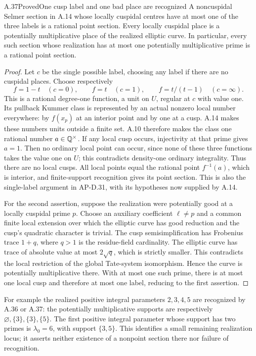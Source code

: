 \begin{statement}{A.37}{Proved}{One cusp label and one bad place are recognized}
A noncuspidal Selmer section in A.14 whose locally cuspidal centres
have at most one of the three labels is a rational point section.
Every locally cuspidal place is a potentially multiplicative place
of the realized elliptic curve.  In particular, every such section
whose realization has at most one potentially multiplicative prime
is a rational point section.
\end{statement}
\begin{proof}
Let $c$ be the single possible label, choosing any label if there are
no cuspidal places.  Choose respectively
\[
       f=1-t\quad(c=0),\qquad f=t\quad(c=1),\qquad
       f=t/(t-1)\quad(c=\infty).
\]
This is a rational degree-one function, a unit on $U$, regular at
$c$ with value one.  Its pullback Kummer class is represented by an
actual nonzero local number everywhere: by $f(x_p)$ at an interior
point and by one at a cusp.  A.14 makes these numbers units outside
a finite set.  A.10 therefore makes the class one rational number
$a\in\mathbb Q^\times$.  If any local cusp occurs, injectivity at that
prime gives $a=1$.  Then no ordinary local point can occur, since
none of these three functions takes the value one on $U$; this
contradicts density-one ordinary integrality.  Thus there are no
local cusps.  All local points equal the rational point $f^{-1}(a)$,
which is interior, and finite-support recognition gives its point
section.  This is also the single-label argument in AP-D.31, with
its hypotheses now supplied by A.14.

For the second assertion, suppose the realization were potentially
good at a locally cuspidal prime $p$.  Choose an auxiliary coefficient
$\ell\ne p$ and a common finite local extension over which the
elliptic curve has good reduction and the cusp's quadratic character
is trivial.  The cusp semisimplification has Frobenius trace $1+q$,
where $q>1$ is the residue-field cardinality.  The elliptic curve has
trace of absolute value at most $2\sqrt q$, which is strictly smaller.
This contradicts the local restriction of the global Tate-system
isomorphism.  Hence the curve is potentially multiplicative there.
With at most one such prime, there is at most one local cusp and
therefore at most one label, reducing to the first assertion.
\end{proof}
For example the realized positive integral parameters $2,3,4,5$ are
recognized by A.36 or A.37: the potentially multiplicative supports
are respectively $\varnothing,\{3\},\{3\},\{5\}$.
The first positive integral parameter whose support has two primes is
$\lambda_0=6$, with support $\{3,5\}$.
This identifies a small remaining realization locus; it asserts
neither existence of a nonpoint section there nor failure of recognition.
